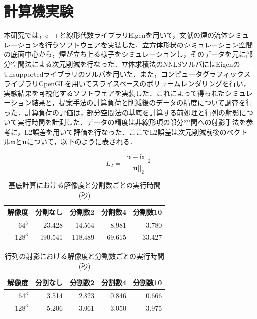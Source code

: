 \documentclass[a4j,12pt]{jreport}
\begin{document}
\chapter{計算機実験}
本研究では，c++と線形代数ライブラリEigenを用いて，文献\cite{fedkiw}の煙の流体シミュレーションを行うソフトウェアを実装した．立方体形状のシミュレーション空間の底面中心から，煙が立ち上る様子をシミュレーションし，そのデータを元に部分空間法による次元削減を行なった．立体求積法のNNLSソルバにはEigenのUnsupportedライブラリのソルバを用いた．また，コンピュータグラフィックスライブラリOpenGLを用いてスライスベースのボリュームレンダリングを行い，実験結果を可視化するソフトウェアを実装した．これによって得られたシミュレーション結果と，提案手法の計算負荷と削減後のデータの精度について調査を行った．計算負荷の評価は，部分空間法の基底を計算する前処理と行列の射影について実行時間を計測した．データの精度は非線形項の部分空間への射影手法\cite{projection_base}を参考に，L2誤差を用いて評価を行なった．ここでL2誤差は次元削減前後のベクトル$\bm{u}$と$\bm{\tilde{u}}$について，以下のように表される．

\[
L_2 = \frac{|| \bm{u} - \bm{\tilde{u}} ||_2}{||  \bm{u} ||_2}
\]

\begin {table}[htbp]
    \centering
  \caption{基底計算における解像度と分割数ごとの実行時間(秒)}
  \label{tab:basis}
  \begin {tabular}{rrrrr} \hline
    \multicolumn{1}{c}{解像度} 					&\multicolumn{1}{c}{分割なし} 		&\multicolumn{1}{c}{分割数2}			&\multicolumn{1}{c}{分割数4} 		&\multicolumn{1}{c}{分割数10}\\ \hline
    $64^3$ 					& 23.428 			&14.564	 		&8.981	 	&3.780\\
    $128^3$ 				& 190.541 		&118.489 			& 69.615 		&33.427\\ \hline
  \end {tabular}
\end {table}


\begin {table}[htbp]
    \centering
  \caption{行列の射影における解像度と分割数ごとの実行時間(秒)}
  \label{tab:projection}
  \begin {tabular}{rrrrr} \hline
    \multicolumn{1}{c}{解像度} 					&\multicolumn{1}{c}{分割なし} 		&\multicolumn{1}{c}{分割数2}			&\multicolumn{1}{c}{分割数4} 		&\multicolumn{1}{c}{分割数10}\\ \hline
    $64^3$ 					& 3.514 			&2.823	 		&0.846	 		&0.666\\
    $128^3$ 				& 5.206 			& 3.061 			& 3.050 		&3.975\\ \hline
  \end {tabular}
\end {table}
\end{document}
